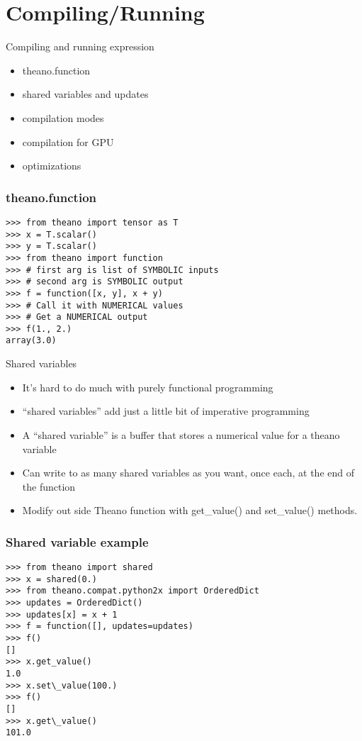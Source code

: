 \documentclass[utf8x,xcolor=pdftex,dvipsnames,table]{beamer}
\begin{document}
\section{Compiling/Running}
\begin{frame}{Compiling and running expression}
  \begin{itemize}
  \item theano.function
  \item shared variables and updates
  \item compilation modes
  \item compilation for GPU
  \item optimizations
  \end{itemize}
\end{frame}

\begin{frame}[fragile]
  \frametitle{theano.function}

\begin{lstlisting}
>>> from theano import tensor as T
>>> x = T.scalar()
>>> y = T.scalar()
>>> from theano import function
>>> # first arg is list of SYMBOLIC inputs
>>> # second arg is SYMBOLIC output
>>> f = function([x, y], x + y)
>>> # Call it with NUMERICAL values
>>> # Get a NUMERICAL output
>>> f(1., 2.)
array(3.0)
\end{lstlisting}
\end{frame}

\begin{frame}{Shared variables}
  \begin{itemize}
  \item It’s hard to do much with purely functional programming
  \item ``shared variables'' add just a little bit of imperative programming
  \item A “shared variable” is a buffer that stores a numerical value for a theano variable
  \item Can write to as many shared variables as you want, once each, at the end of the function
  \item  Modify out side Theano function with get\_value() and set\_value() methods.
  \end{itemize}
\end{frame}

\begin{frame}[fragile]
  \frametitle{Shared variable example}

\begin{lstlisting}
>>> from theano import shared
>>> x = shared(0.)
>>> from theano.compat.python2x import OrderedDict
>>> updates = OrderedDict()
>>> updates[x] = x + 1
>>> f = function([], updates=updates)
>>> f()
[]
>>> x.get_value()
1.0
>>> x.set\_value(100.)
>>> f()
[]
>>> x.get\_value()
101.0
\end{lstlisting}
\end{frame}
\end{document}
